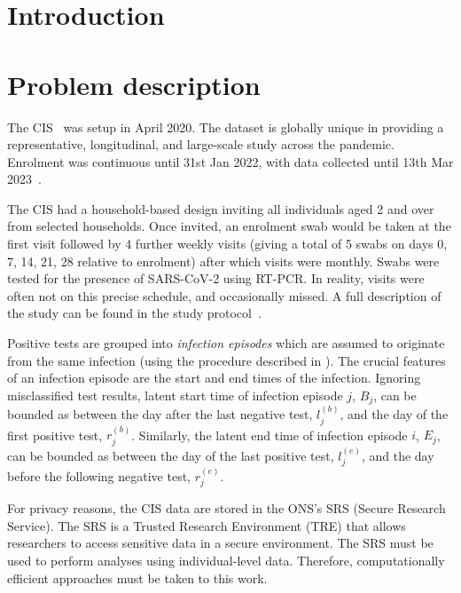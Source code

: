 \documentclass[12pt]{article}
\begin{document}
\newpage
{} %
\section{Introduction}
\label{sec:intro}


\section{Problem description}

The CIS~\citep{CIS} was setup in April 2020.
The dataset is globally unique in providing a representative, longitudinal, and large-scale study across the pandemic.
Enrolment was continuous until 31st Jan 2022, with data collected until 13th Mar 2023~\citep{weiRisk}. 

The CIS had a household-based design inviting all individuals aged 2 and over from selected households.
Once invited, an enrolment swab would be taken at the first visit followed by 4 further weekly visits (giving a total of 5 swabs on days 0, 7, 14, 21, 28 relative to enrolment) after which visits were monthly.
Swabs were tested for the presence of SARS-CoV-2 using RT-PCR.
In reality, visits were often not on this precise schedule, and occasionally missed.
A full description of the study can be found in the study protocol~\citep{cisProtocol}.

Positive tests are grouped into \emph{infection episodes} which are assumed to originate from the same infection (using the procedure described in \citep{weiRisk}).
The crucial features of an infection episode are the start and end times of the infection.
Ignoring misclassified test results, latent start time of infection episode $j$, $B_j$, can be bounded as between the day after the last negative test, $l_j^{(b)}$, and the day of the first positive test, $r_j^{(b)}$.
Similarly, the latent end time of infection episode $i$, $E_j$, can be bounded as between the day of the last positive test, $l_j^{(e)}$, and the day before the following negative test, $r_j^{(e)}$.


For privacy reasons, the CIS data are stored in the ONS's SRS (Secure Research Service).
The SRS is a Trusted Research Environment (TRE) that allows researchers to access sensitive data in a secure environment.
The SRS must be used to perform analyses using individual-level data.
Therefore, computationally efficient approaches must be taken to this work.
\end{document}
